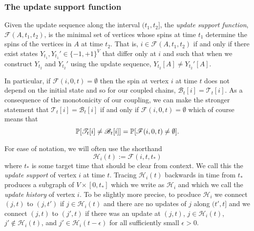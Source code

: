 	\subsubsection{The update support function}
	\label{sec: definition update support function}
	Given the update sequence along the interval $(t_1, t_2]$, the \emph{update support function}, $\mathscr{F}(A, t_1, t_2)$, is the minimal set of vertices whose spins at time $t_1$ determine the spins of the vertices in $A$ at time $t_2$. That is, $i \in \mathscr{F}(A, t_1, t_2)$ if and only if there exist states $Y_{t_1}, Y_{t_1}' \in \{-1, +1\}^{V}$ that differ only at $i$ and such that when we construct $Y_{t_2}$ and $Y_{t_2}'$ using the update sequence, $Y_{t_2}[A] \neq Y_{t_2}'[A]$.

	In particular, if $\mathscr{F}(i, 0, t) = \emptyset$ then the spin at vertex $i$ at time $t$ does not depend on the initial state and so for our coupled chains, $\mathscr{B}_t[i] = \mathscr{T}_t[i]$.
	As a consequence of the monotonicity of our coupling, we can make the stronger statement that $\mathscr{T}_t[i] = \mathscr{B}_t[i]$ if and only if $\mathscr{F}(i, 0, t) = \emptyset$ which of course means that
	\begin{equation}
	\label{eq:prob equality of coupling and empty support}
		\mathbb{P}[\mathscr{T}_t[i] \neq \mathscr{B}_t[i]] = \mathbb{P}[\mathscr{F}(i, 0, t) \neq \emptyset].
	\end{equation}

	For ease of notation, we will often use the shorthand
	\begin{equation}
		\mathcal{H}_i(t) := \mathscr{F}(i, t, t_*)
	\end{equation}
	where $t_*$ is some target time that should be clear from context. We call this the \emph{update support} of vertex $i$ at time $t$. Tracing $\mathcal{H}_i(t)$ backwards in time from $t_*$ produces a subgraph of $V \times [0, t_*]$ which we write as $\mathcal{H}_i$ and which we call the \emph{update history} of vertex $i$. To be slightly more precise, to produce $\mathcal{H}_i$ we connect $(j,t)$ to $(j,t')$ if $j \in \mathcal{H}_i(t)$ and there are no updates of $j$ along $(t', t]$ and we connect $(j,t)$ to $(j',t)$ if there was an update at $(j, t)$, $j \in \mathcal{H}_i(t)$, $j' \notin \mathcal{H}_i(t)$, and $j' \in \mathcal{H}_i(t-\epsilon)$ for all sufficiently small $\epsilon > 0$.

